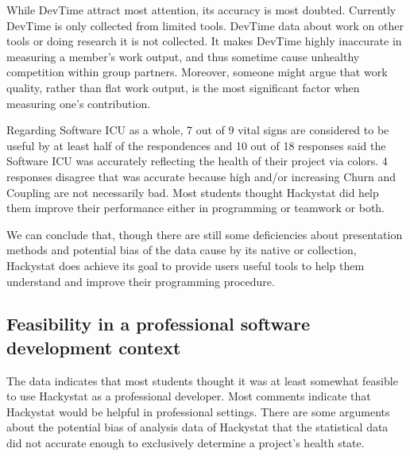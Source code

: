 \documentclass[11pt]{article}
\begin{document}

While DevTime attract most attention, its accuracy is most doubted. Currently DevTime is only collected from limited tools. DevTime data about work on other tools or doing research it is not collected. It makes DevTime highly inaccurate in measuring a member's work output, and thus sometime cause unhealthy competition within group partners. Moreover, someone might argue that work quality, rather than flat work output, is the most significant factor when measuring one's contribution.

Regarding Software ICU as a whole, 7 out of 9 vital signs are considered to be useful by at least half of the respondences and 10 out of 18 responses said the Software ICU was accurately reflecting the health of their project via colors. 4 responses disagree that was accurate because high and/or increasing Churn and Coupling are not necessarily bad. Most students thought Hackystat did help them improve their performance either in programming or teamwork or both.

We can conclude that, though there are still some deficiencies about presentation methods and potential bias of the data cause by its native or collection, Hackystat does achieve its goal to provide users useful tools to help them understand and improve their programming procedure.


\subsection {Feasibility in a professional software development context}
The data indicates that most students thought it was at least somewhat feasible to use Hackystat as a professional developer. Most comments indicate that Hackystat would be helpful in professional settings. There are some arguments about the potential bias of analysis data of Hackystat that the statistical data did not accurate enough to exclusively determine a project's health state.
\end{document}
